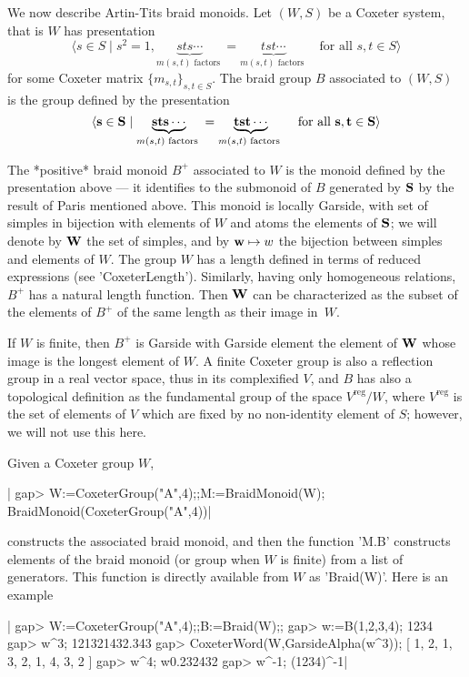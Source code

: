 We  now describe Artin-Tits braid monoids. Let $(W,S)$ be a Coxeter system,
that is $W$ has presentation
$$
  \langle s\in S \mid s^2=1,
         \underbrace{sts\cdots}_{m(s,t)\text{ factors }}=
         \underbrace{tst\cdots}_{m(s,t)\text{ factors }}
    \quad \text{for all $s,t\in S$} \rangle
$$
for some Coxeter matrix $\{m_{s,t}\}_{s,t\in S}$. The braid group $B$
associated to $(W,S)$ is the group defined by the presentation
$$
   \langle {\bf s}\in{\bf S}\mid
         \underbrace{{\bf s}{\bf t}{\bf s}\cdots}_{m(s,t)\text{ factors }}=
         \underbrace{{\bf t}{\bf s}{\bf t}\cdots}_{m(s,t)\text{ factors }}
    \quad \text{for all ${\bf s},{\bf t}\in{\bf S}$}\rangle
$$

The  *positive* braid monoid $B^+$ associated  to $W$ is the monoid defined
by  the  presentation  above  ---  it  identifies  to  the submonoid of $B$
generated  by ${\bf S}$ by the result of Paris mentioned above. This monoid
is  locally Garside, with set of simples  in bijection with elements of $W$
and  atoms  the  elements  of  ${\bf S}$;  we  will  denote by ${\bf W}$ the set of
simples,  and by ${\bf w}\mapsto w$ the  bijection between simples and elements
of  $W$. The group $W$ has a length defined in terms of reduced expressions
(see  'CoxeterLength'). Similarly, having only homogeneous relations, $B^+$
has  a  natural  length  function.  Then  ${\bf W}$ can be characterized as the
subset of the elements of $B^+$ of the same length as their image in~$W$.

If $W$ is finite, then $B^+$ is Garside with Garside element the element of
${\bf W}$  whose image is the longest element of $W$. A finite Coxeter group is
also  a reflection group in  a real vector space,  thus in its complexified
$V$,  and $B$ has also a topological definition as the fundamental group of
the space $V^{\text{reg}}/W$, where $V^{\text{reg}}$ is the set of elements
of  $V$ which are fixed by no non-identity element of $S$; however, we will
not use this here.

Given a Coxeter group $W$,

|    gap> W:=CoxeterGroup("A",4);;M:=BraidMonoid(W);
    BraidMonoid(CoxeterGroup("A",4))|

constructs  the  associated  braid  monoid,  and  then  the  function 'M.B'
constructs  elements of the braid monoid (or group when $W$ is finite) from
a  list  of  generators.  This  function  is directly available from $W$ as
'Braid(W)'. Here is an example\:

|    gap> W:=CoxeterGroup("A",4);;B:=Braid(W);;
    gap> w:=B(1,2,3,4);
    1234
    gap> w^3;
    121321432.343
    gap> CoxeterWord(W,GarsideAlpha(w^3));
    [ 1, 2, 1, 3, 2, 1, 4, 3, 2 ]
    gap> w^4;
    w0.232432
    gap> w^-1;
    (1234)^-1|

